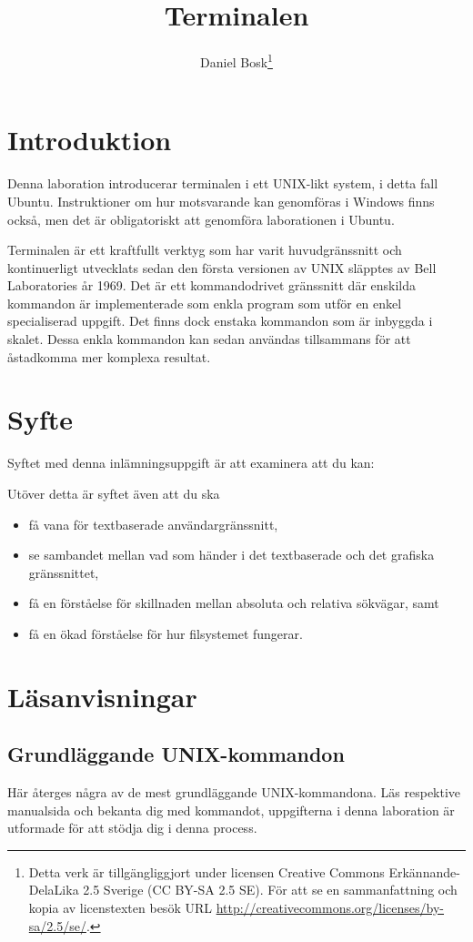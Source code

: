 \documentclass[a4paper]{miunasgn}
\title{Terminalen}
\author{Daniel Bosk\footnote{%
  Detta verk är tillgängliggjort under licensen Creative Commons 
  Erkännande-DelaLika 2.5 Sverige (CC BY-SA 2.5 SE).
  För att se en sammanfattning och kopia av licenstexten besök URL 
  \url{http://creativecommons.org/licenses/by-sa/2.5/se/}.
}}
\date{\svnId}
\begin{document}
\maketitle
\thispagestyle{foot}
\tableofcontents


\section{Introduktion}
\label{sec:Introduktion}
\noindent
Denna laboration introducerar terminalen i ett UNIX-likt system, i detta fall 
Ubuntu.
Instruktioner om hur motsvarande kan genomföras i Windows finns också, men det 
är obligatoriskt att genomföra laborationen i Ubuntu.

Terminalen är ett kraftfullt verktyg som har varit huvudgränssnitt och 
kontinuerligt utvecklats sedan den första versionen av UNIX släpptes av 
\foreignlanguage{english}{Bell Laboratories} år 1969.
Det är ett kommandodrivet gränssnitt där enskilda kommandon är implementerade 
som enkla program som utför en enkel specialiserad uppgift.
Det finns dock enstaka kommandon som är inbyggda i skalet.
Dessa enkla kommandon kan sedan användas tillsammans för att åstadkomma mer 
komplexa resultat.


\section{Syfte}
\label{sec:Syfte}
\noindent
Syftet med denna inlämningsuppgift är att examinera att du kan:
\begin{itemize}
  
\end{itemize}
Utöver detta är syftet även att du ska
\begin{itemize}
  \item få vana för textbaserade användargränssnitt,
  \item se sambandet mellan vad som händer i det textbaserade och det
    grafiska gränssnittet,
  \item få en förståelse för skillnaden mellan absoluta och relativa
    sökvägar, samt
  \item få en ökad förståelse för hur filsystemet fungerar.
\end{itemize}


\section{Läsanvisningar}
\label{sec:Lasanvisningar}
\noindent


\subsection{Grundläggande UNIX-kommandon}
Här återges några av de mest grundläggande UNIX-kommandona.
Läs respektive manualsida och bekanta dig med kommandot, uppgifterna i denna 
laboration är utformade för att stödja dig i denna process.
\end{document}
